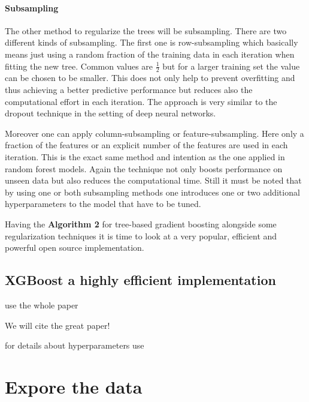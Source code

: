 \documentclass[
]{book}
\begin{document}
\hypertarget{subsampling}{%
\subsubsection{Subsampling}\label{subsampling}}

The other method to regularize the trees will be subsampling. There are two different kinds of subsampling. The first one is row-subsampling which basically means just using a random fraction of the training data in each iteration when fitting the new tree. Common values are \(\frac{1}{2}\) but for a larger training set the value can be chosen to be smaller. This does not only help to prevent overfitting and thus achieving a better predictive performance but reduces also the computational effort in each iteration.\citep{elements} The approach is very similar to the dropout technique in the setting of deep neural networks.

Moreover one can apply column-subsampling or feature-subsampling. Here only a fraction of the features or an explicit number of the features are used in each iteration. This is the exact same method and intention as the one applied in random forest models. Again the technique not only boosts performance on unseen data but also reduces the computational time.\citep{xgboostPaper} Still it must be noted that by using one or both subsampling methods one introduces one or two additional hyperparameters to the model that have to be tuned.

Having the \textbf{Algorithm 2} for tree-based gradient boosting alongside some regularization techniques it is time to look at a very popular, efficient and powerful open source implementation.

\hypertarget{xgboost-a-highly-efficient-implementation}{%
\section{XGBoost a highly efficient implementation}\label{xgboost-a-highly-efficient-implementation}}

use the whole paper

We will cite the great paper!\citep{xgboostPaper}

for details about hyperparameters use \citep{HandsOnMLwithR}

\hypertarget{eda}{%
\chapter{Expore the data}\label{eda}}
\end{document}
